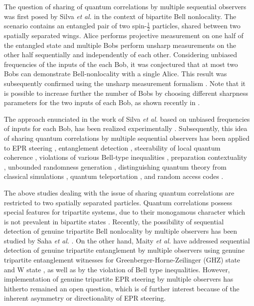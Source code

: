 \documentclass[pra,a4paper,aps,twocolumn,showpacs,superscriptaddress,groupedaddress]{revtex4}
\begin{document}
The question of sharing of quantum correlations by multiple sequential observers was first posed by Silva \textit{et al.} \cite{sygp} in the context of bipartite Bell nonlocality. The scenario contains  an entangled pair of two spin-$\frac{1}{2}$ particles, shared between two spatially separated wings. Alice performs projective measurement on one half of the entangled state and multiple Bobs perform unsharp measurements on the other half sequentially and independently of each other. Considering unbiased frequencies of the inputs of the each Bob, it was conjectured \cite{sygp} that at most two Bobs can demonstrate Bell-nonlocality with a single Alice. This result was subsequently confirmed  \cite{majumdar}  using the unsharp measurement formalism \cite{pb1,pb2}.  Note that it is possible to increase further  the number of Bobs by choosing different sharpness parameters for the two inputs of each Bob, as shown recently in \cite{colbeck}.  

The approach enunciated  in the  work of Silva \textit{et al.} \cite{sygp} based on unbiased frequencies of inputs for each Bob,
has been realized experimentally \cite{exp1,exp2}. Subsequently, this idea of sharing quantum correlations by multiple sequential observers has been applied to  EPR steering \cite{sas, shenoy, Choi2020}, entanglement detection \cite{bera,Foletto,malnew}, steerability of local quantum coherence \cite{saunak},  violations of various Bell-type inequalities \cite{das,rennew,expnew}, preparation contextuality \cite{pcon,akpan},  unbounded randomness generation \cite{ran}, distinguishing quantum theory from classical simulations \cite{cc}, quantum  teleportation \cite{sroy}, and random access codes \cite{rac,exp4,rac1}.

The above studies dealing with the issue of sharing quantum correlations are restricted to two spatially separated particles. Quantum correlations possess special features for tripartite systems, due to their monogamous character which is not prevalent in bipartite states \cite{Dey13,Jeba18,Gupta18}. Recently, the possibility of sequential detection of genuine tripartite Bell nonlocality by multiple observers has been studied by Saha \textit{et al.} \cite{Saha}. On the other hand, Maity \textit{et al.} \cite{Maity2} have addressed sequential detection of genuine tripartite entanglement by multiple observers using genuine tripartite entanglement witnesses \cite{Acin,Bruss,Guh} for Greenberger-Horne-Zeilinger (GHZ) state \cite{GHZ} and W state \cite{wstate}, as well as by the violation of Bell type inequalities.  However, implementation of genuine tripartite EPR steering by multiple observers has hitherto remained an open question, which is of further interest because of the inherent asymmetry or directionality of EPR steering. 
\end{document}
